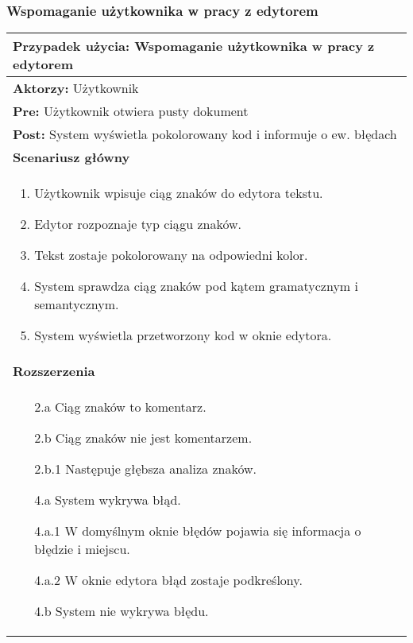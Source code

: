 \subsubsection{Wspomaganie użytkownika w pracy z edytorem}
\label{UCeditor}
\begin{table}[H]
\centering
\begin{tabular}{|p{\textwidth}|}
\hline 
\textbf{Przypadek użycia:} Wspomaganie użytkownika w pracy z edytorem\\
\hline
\textbf{Aktorzy:} Użytkownik\\
\hline
\textbf{Pre:} Użytkownik otwiera pusty dokument\\
\hline
\textbf{Post:} System wyświetla pokolorowany kod i informuje o ew. błędach\\
\hline
\textbf{Scenariusz główny}\\
\hline
\begin{enumerate}
\item Użytkownik wpisuje ciąg znaków do edytora tekstu.
\item Edytor rozpoznaje typ ciągu znaków.
\item Tekst zostaje pokolorowany na odpowiedni kolor.
\item System sprawdza ciąg znaków pod kątem gramatycznym i semantycznym.
\item System wyświetla przetworzony kod w oknie edytora.
\end{enumerate}\\
\hline
\textbf{Rozszerzenia}\\
\hline
\begin{enumerate}
\item[2.a] Ciąg znaków to komentarz.
\item[2.b] Ciąg znaków nie jest komentarzem.
\item[2.b.1] Następuje głębsza analiza znaków.
\item[4.a] System wykrywa błąd. 
\item[4.a.1] W domyślnym oknie błędów pojawia się informacja o błędzie i miejscu.
\item[4.a.2] W oknie edytora błąd zostaje podkreślony.
\item[4.b] System nie wykrywa błędu.
\end{enumerate}\\
\hline
\end{tabular} 
\end{table}
